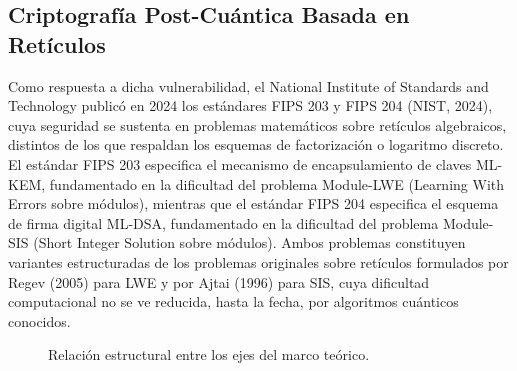 \subsection{Criptografía Post-Cuántica Basada en Retículos}

Como respuesta a dicha vulnerabilidad, el National Institute of Standards and Technology publicó en 2024 los estándares FIPS 203 y FIPS 204 (NIST, 2024), cuya seguridad se sustenta en problemas matemáticos sobre retículos algebraicos, distintos de los que respaldan los esquemas de factorización o logaritmo discreto. El estándar FIPS 203 especifica el mecanismo de encapsulamiento de claves ML-KEM, fundamentado en la dificultad del problema Module-LWE (Learning With Errors sobre módulos), mientras que el estándar FIPS 204 especifica el esquema de firma digital ML-DSA, fundamentado en la dificultad del problema Module-SIS (Short Integer Solution sobre módulos). Ambos problemas constituyen variantes estructuradas de los problemas originales sobre retículos formulados por Regev (2005) para LWE y por Ajtai (1996) para SIS, cuya dificultad computacional no se ve reducida, hasta la fecha, por algoritmos cuánticos conocidos.

\begin{figure}[h]
	\centering
	\caption{Relación estructural entre los ejes del marco teórico.}
	\label{fig:marco_teorico}
	\par{}
\end{figure}
